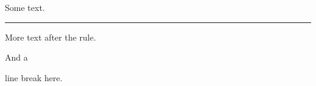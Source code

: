 Some text.

\par\noindent\rule{\linewidth}{0.4pt}

More text after the rule.

And a 

 line break here.
